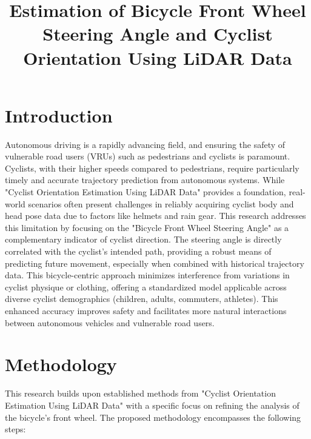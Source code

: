 \documentclass{article}
\title{Estimation of Bicycle Front Wheel Steering Angle and Cyclist Orientation Using LiDAR Data}
\date{}
\begin{document}
\maketitle

\section{Introduction}

Autonomous driving is a rapidly advancing field, and ensuring the safety of vulnerable road users (VRUs) such as pedestrians and cyclists is paramount. Cyclists, with their higher speeds compared to pedestrians, require particularly timely and accurate trajectory prediction from autonomous systems. While "Cyclist Orientation Estimation Using LiDAR Data" \cite{Chang2023} provides a foundation, real-world scenarios often present challenges in reliably acquiring cyclist body and head pose data due to factors like helmets and rain gear. This research addresses this limitation by focusing on the "Bicycle Front Wheel Steering Angle" as a complementary indicator of cyclist direction. The steering angle is directly correlated with the cyclist's intended path, providing a robust means of predicting future movement, especially when combined with historical trajectory data. This bicycle-centric approach minimizes interference from variations in cyclist physique or clothing, offering a standardized model applicable across diverse cyclist demographics (children, adults, commuters, athletes). This enhanced accuracy improves safety and facilitates more natural interactions between autonomous vehicles and vulnerable road users.

\section{Methodology}

This research builds upon established methods from "Cyclist Orientation Estimation Using LiDAR Data" \cite{Chang2023} with a specific focus on refining the analysis of the bicycle's front wheel. The proposed methodology encompasses the following steps:
\end{document}
